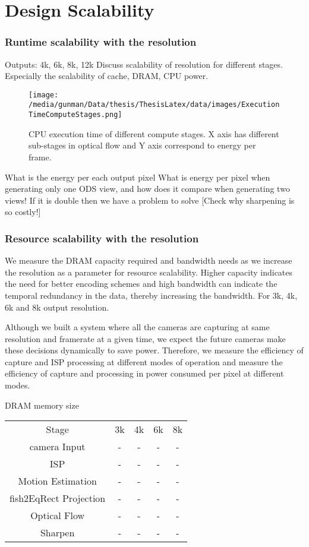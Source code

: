 \section{Design Scalability}	

\subsubsection{Runtime scalability with the resolution}
Outputs:
4k, 6k, 8k, 12k
Discuss scalability of resolution for different stages. \newline
Especially the scalability of cache, DRAM, CPU power. 
\begin{figure*}
	\begin{center}
		\texttt{[image: /media/gunman/Data/thesis/ThesisLatex/data/images/ExecutionTimeComputeStages.png]}
		\caption{CPU execution time of different compute stages. X axis has different sub-stages in optical flow and Y axis correspond to energy per frame.}
		\label{fig:ex_4_9}
	\end{center}
	\vspace{-0.3in}
\end{figure*} 

What is the energy per each output pixel	
What is energy per pixel when generating only one ODS view, and how does it compare when generating two views! If it is double then we have a problem to solve	
[Check why sharpening is so costly!]

\subsubsection{Resource scalability with the resolution}
We measure the DRAM capacity required and bandwidth needs as we increase the resolution as a parameter for resource scalability. Higher capacity indicates the need for better encoding schemes and high bandwidth can indicate the temporal redundancy in the data, thereby increasing the bandwidth. For 3k, 4k, 6k and 8k output resolution.

Although we built a system where all the cameras are capturing at same resolution and framerate at a given time, we expect the future cameras make these decisions dynamically to save power. Therefore, we  measure the efficiency of capture and ISP processing at different modes of operation and measure the efficiency of capture and processing in power consumed per pixel at different modes.

DRAM memory size\newline
\begin{tabular}{c|c|c|c|c}
	Stage & 3k & 4k & 6k & 8k \\
	camera Input & - & - & - & - \\
	ISP & - & - & - & - \\
	Motion Estimation & - & - & - & - \\
	fish2EqRect Projection & - & - & - & - \\
	Optical Flow & - & - & - & - \\
	Sharpen & - & - & - & - \\
\end{tabular} 

